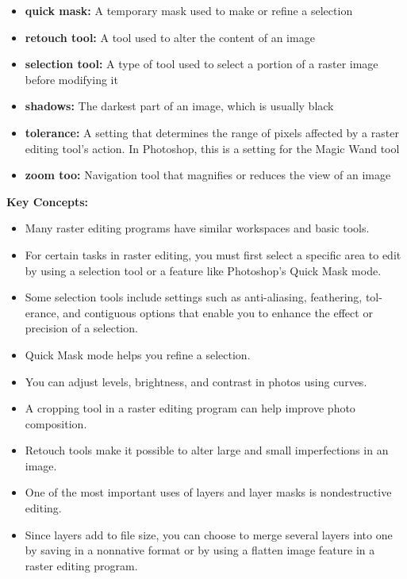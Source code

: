 \documentclass{report}
\begin{document}
\begin{itemize}
        \item \textbf{quick mask:} A temporary mask used to make or refine a selection
        \item \textbf{retouch tool:} A tool used to alter the content of an image
        \item \textbf{selection tool:} A type of tool used to select a portion of a raster image before modifying it
        \item \textbf{shadows:} The darkest part of an image, which is usually black
        \item \textbf{tolerance:} A setting that determines the range of pixels affected by a raster editing tool’s action. In Photoshop, this is a setting for the Magic Wand tool
        \item \textbf{zoom too:} Navigation tool that magnifies or reduces the view of an image
    \end{itemize}

    \bigbreak \bigbreak \noindent
    \begin{Large}
        \textbf{Key Concepts:}
    \end{Large}
    \bigbreak \noindent
    \begin{itemize}
        \item Many raster editing programs have similar workspaces and basic tools. 
       
        \item For certain tasks in raster editing, you must first select a specific area to edit by using a selection tool or a feature like Photoshop’s Quick Mask mode. 

        \item Some selection tools include settings such as anti-aliasing, feathering, tol-erance, and contiguous options that enable you to enhance the effect or precision of a selection.

        \item Quick Mask mode helps you refine a selection.

        \item You can adjust levels, brightness, and contrast in photos using curves. 

        \item A cropping tool in a raster editing program can help improve photo composition. 

        \item Retouch tools make it possible to alter large and small imperfections in an image. 

        \item One of the most important uses of layers and layer masks is nondestructive editing. 

        \item Since layers add to file size, you can choose to merge several layers into one by saving in a nonnative format or by using a flatten image feature in a raster editing program. 
    \end{itemize}
\end{document}
